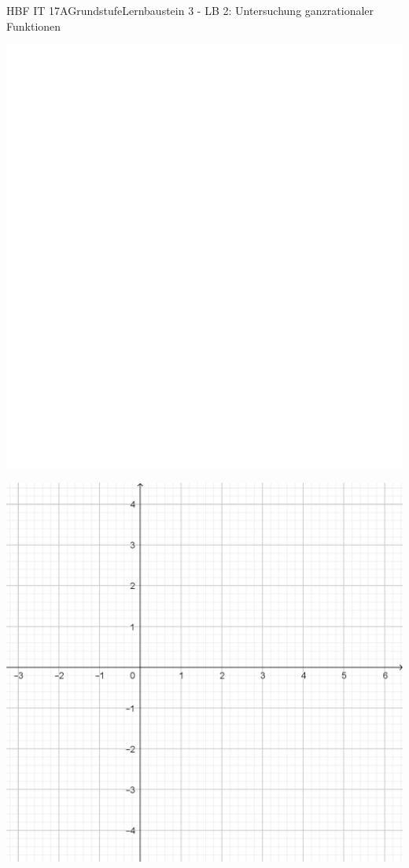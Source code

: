 \documentclass[oneside,openany,headings=optiontotoc,11pt,numbers=noenddot]{scrreprt}
\begin{document}
\begin{worksheet}{HBF IT 17A}{Grundstufe}{Lernbaustein 3 - LB 2: Untersuchung ganzrationaler Funktionen}
\begin{framed}
			\includegraphics[scale=0.15]{../empty.jpg}
		\end{framed}
		\newpage
		\begin{framed}
			\noindent
			\centering
			\includegraphics[scale=0.5]{Bilder/Koord_f.png}

\end{framed}
\end{worksheet}
\end{document}
